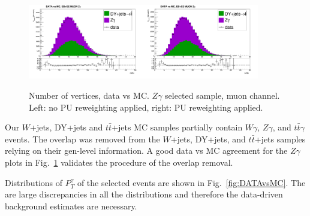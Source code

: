 \begin{figure}[htb]
  \begin{center}
   \includegraphics[width=0.45\textwidth]{../figs/figs_v11/MUON_ZGamma/PrepareYields/c_TotalDATAvsMC_EtaCommon__nVtx_noPU.png}\includegraphics[width=0.45\textwidth]{../figs/figs_v11/MUON_ZGamma/PrepareYields/c_TotalDATAvsMC_EtaCommon__nVtx.png}
  \caption{Number of vertices, data vs MC. $Z\gamma$ selected sample, muon channel. Left: no PU reweighting applied, right: PU reweighting applied. }
  \label{fig:DATAvsMC_nVtx}
  \end{center}
\end{figure}



Our $W$+jets, DY+jets and $t\bar{t}$+jets MC samples partially contain $W\gamma$, $Z\gamma$, and $t\bar{t}\gamma$ events. The overlap was removed from the $W$+jets, DY+jets, and $t\bar{t}$+jets samples relying on their gen-level information. A good data vs MC agreement for the $Z\gamma$ plots in Fig.~\ref{fig:DATAvsMC_nVtx} validates the procedure of the overlap removal.

Distributions of $P_T^{\gamma}$ of the selected events are shown in Fig.~\ref{fig:DATAvsMC}. The are large discrepancies in all the distributions and therefore the data-driven background estimates are necessary.


